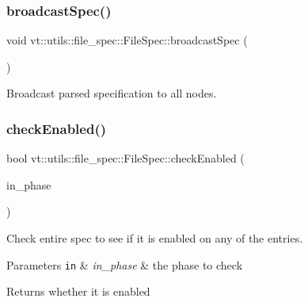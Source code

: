 \subsubsection{\texorpdfstring{broadcast\+Spec()}{broadcastSpec()}}
{\footnotesize\ttfamily void vt\+::utils\+::file\+\_\+spec\+::\+File\+Spec\+::broadcast\+Spec (\begin{DoxyParamCaption}{ }\end{DoxyParamCaption})}



Broadcast parsed specification to all nodes. 

\mbox{\label{structvt_1_1utils_1_1file__spec_1_1_file_spec_ae7850a9915fb65decca92eb68f2293cb}} 
\subsubsection{\texorpdfstring{check\+Enabled()}{checkEnabled()}}
{\footnotesize\ttfamily bool vt\+::utils\+::file\+\_\+spec\+::\+File\+Spec\+::check\+Enabled (\begin{DoxyParamCaption}\item[{\hyperlink{structvt_1_1utils_1_1file__spec_1_1_file_spec_a3817fca09dbe932e0f6ba5729f1965ba}{Spec\+Index}}]{in\+\_\+phase }\end{DoxyParamCaption})}



Check entire spec to see if it is enabled on any of the entries. 


\begin{DoxyParams}[1]{Parameters}
\mbox{\tt in}  & {\em in\+\_\+phase} & the phase to check\\
\hline
\end{DoxyParams}
\begin{DoxyReturn}{Returns}
whether it is enabled 
\end{DoxyReturn}
\mbox{\label{structvt_1_1utils_1_1file__spec_1_1_file_spec_a918b12138f66bca9fbc82d02e3c6ef58}} 
